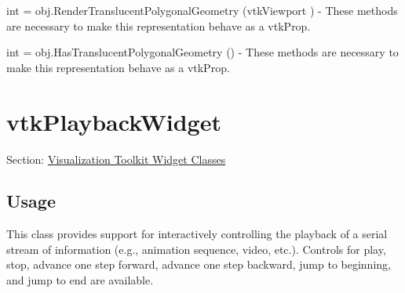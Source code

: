 \begin{DoxyItemize}
\item {\ttfamily int = obj.\-Render\-Translucent\-Polygonal\-Geometry (vtk\-Viewport )} -\/ These methods are necessary to make this representation behave as a vtk\-Prop.  
\item {\ttfamily int = obj.\-Has\-Translucent\-Polygonal\-Geometry ()} -\/ These methods are necessary to make this representation behave as a vtk\-Prop.  
\end{DoxyItemize}\hypertarget{vtkwidgets_vtkplaybackwidget}{}\section{vtk\-Playback\-Widget}\label{vtkwidgets_vtkplaybackwidget}
Section\-: \hyperlink{sec_vtkwidgets}{Visualization Toolkit Widget Classes} \hypertarget{vtkwidgets_vtkxyplotwidget_Usage}{}\subsection{Usage}\label{vtkwidgets_vtkxyplotwidget_Usage}
This class provides support for interactively controlling the playback of a serial stream of information (e.\-g., animation sequence, video, etc.). Controls for play, stop, advance one step forward, advance one step backward, jump to beginning, and jump to end are available.

